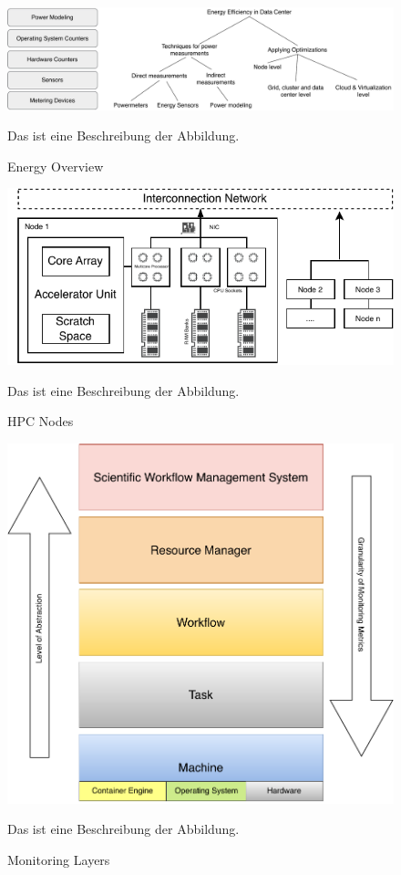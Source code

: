 \begin{figure}[H]
    \centering
    \includegraphics[scale=0.4]{fig/02/02-energy-overview.pdf}
    \caption{Energy Overview}
    \label{fig:02-energy-overview}
    \tiny
    Das ist eine Beschreibung der Abbildung.
\end{figure}

\begin{figure}[H]
    \centering
    \includegraphics[scale=1.2]{fig/02/02-hpc-nodes.pdf}
    \caption{HPC Nodes}
    \label{fig:02-hpc-nodes}
    \tiny
    Das ist eine Beschreibung der Abbildung.
\end{figure}

\begin{figure}[H]
    \centering
    \includegraphics[scale=0.5]{fig/02/02-monitoring-layers.pdf}
    \caption{Monitoring Layers}
    \label{fig:02-monitoring-layers}
    \tiny
    Das ist eine Beschreibung der Abbildung.
\end{figure}

